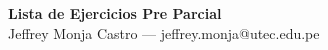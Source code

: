 \begin{center}
    {\Large \textbf{Lista de Ejercicios Pre Parcial}} \\[0.2cm]
    Jeffrey Monja Castro --- jeffrey.monja@utec.edu.pe \\[0.2cm]
\end{center}